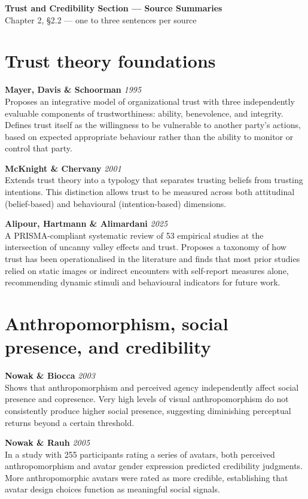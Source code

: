\documentclass[11pt]{article}
\newcommand{\entry}[3]{%
  \noindent\textbf{#1} \hfill \textit{#2}\\
  #3
  \vspace{0.9em}
  \par
}
\begin{document}
\begin{center}
  {\sffamily\bfseries\huge Trust and Credibility Section --- Source Summaries}\\[4pt]
  {\sffamily\large Chapter 2, \S 2.2 --- one to three sentences per source}
\end{center}
\vspace{1em}

\section*{Trust theory foundations}

\entry{Mayer, Davis \& Schoorman}{1995}{
Proposes an integrative model of organizational trust with three independently evaluable components of trustworthiness: ability, benevolence, and integrity. Defines trust itself as the willingness to be vulnerable to another party's actions, based on expected appropriate behaviour rather than the ability to monitor or control that party.
}

\entry{McKnight \& Chervany}{2001}{
Extends trust theory into a typology that separates trusting beliefs from trusting intentions. This distinction allows trust to be measured across both attitudinal (belief-based) and behavioural (intention-based) dimensions.
}

\entry{Alipour, Hartmann \& Alimardani}{2025}{
A PRISMA-compliant systematic review of 53 empirical studies at the intersection of uncanny valley effects and trust. Proposes a taxonomy of how trust has been operationalised in the literature and finds that most prior studies relied on static images or indirect encounters with self-report measures alone, recommending dynamic stimuli and behavioural indicators for future work.
}

\section*{Anthropomorphism, social presence, and credibility}

\entry{Nowak \& Biocca}{2003}{
Shows that anthropomorphism and perceived agency independently affect social presence and copresence. Very high levels of visual anthropomorphism do not consistently produce higher social presence, suggesting diminishing perceptual returns beyond a certain threshold.
}

\entry{Nowak \& Rauh}{2005}{
In a study with 255 participants rating a series of avatars, both perceived anthropomorphism and avatar gender expression predicted credibility judgments. More anthropomorphic avatars were rated as more credible, establishing that avatar design choices function as meaningful social signals.
}
\end{document}
